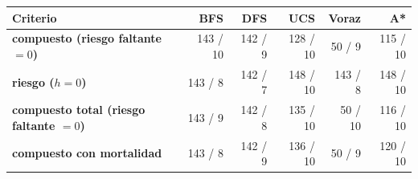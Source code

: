 \renewcommand{\arraystretch}{1.2}
\begin{tabular}{|l|r|r|r|r|r|}
\hline
\rowcolor{gray!20} \textbf{Criterio} & \textbf{BFS} & \textbf{DFS} & \textbf{UCS} & \textbf{Voraz} & \textbf{A*} \\
\hline
\textbf{compuesto (riesgo faltante $=0$)} & 143 / 10 & 142 / 9 & 128 / 10 & 50 / 9 & 115 / 10 \\
\hline
\textbf{riesgo ($h=0$)} & 143 / 8 & 142 / 7 & 148 / 10 & 143 / 8 & 148 / 10 \\
\hline
\textbf{compuesto total (riesgo faltante $=0$)} & 143 / 9 & 142 / 8 & 135 / 10 & 50 / 10 & 116 / 10 \\
\hline
\textbf{compuesto con mortalidad} & 143 / 8 & 142 / 9 & 136 / 10 & 50 / 9 & 120 / 10 \\
\hline
\end{tabular}
